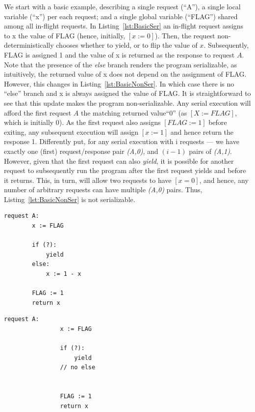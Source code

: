 We start with a basic example, describing a single request (``A''), a single local variable (``x'') per each request; and a single global variable (``FLAG'') shared among all in-flight requests. 
%
In Listing~\ref{lst:BasicSer} an in-flight request assigns to x the value of FLAG (hence, initially, $[x:=0]$). Then, the request non-deterministically chooses whether to yield, or to flip the value of $x$. Subsequently, FLAG is assigned 1 and the value of x is returned as the response to request $A$. 
%
Note that the presence of the \textit{else} branch renders the program serializable, as intuitively, the returned value of x does not depend on the assignment of FLAG.
%
However, this changes in  Listing~\ref{lst:BasicNonSer}. In which case there is no ``else'' branch and x is always assigned the value of FLAG.
%
It is straightforward to see that this update makes the program non-serializable. Any serial execution will afford the first request $A$ the matching returned value``0'' (as $[X:=FLAG]$, which is initially 0). As the first request also assigns $[FLAG:=1]$ before exiting, any subsequent execution will assign $[x:=1]$ and hence return the response 1. Differently put, for any serial execution with i requests --- we have exactly one (first) request/response pair \textit{(A,0)}, and $(i-1)$ pairs of \textit{(A,1)}.
%
However, given that the first request can also \textit{yield}, it is possible for another request to subsequently run the program after the first request yields and before it returns. This, in turn, will allow two requests to have $[x=0]$, and hence, any number of arbitrary requests can have multiple \textit{(A,0)} pairs. Thus, Listing~\ref{lst:BasicNonSer} is not serializable.





\noindent
\begin{minipage}[t]{0.45\textwidth}
	\begin{lstlisting}[caption={Serializable},
		label={lst:BasicSer}]
	request A: 
		x := FLAG
		
		if (?):
			yield
		else:
			x := 1 - x
		
		FLAG := 1
		return x
	\end{lstlisting}
\end{minipage}
\hfill
\begin{minipage}[t]{0.45\textwidth}
	\begin{lstlisting}[caption={Not serializable: {(A,0),(A,0)}},
	label={lst:BasicNonSer}]
			request A: 
			    x := FLAG 
			
			    if (?): 
			        yield
			    // no else
			
			
			    FLAG := 1 
			    return x
		\end{lstlisting}
\end{minipage}%

